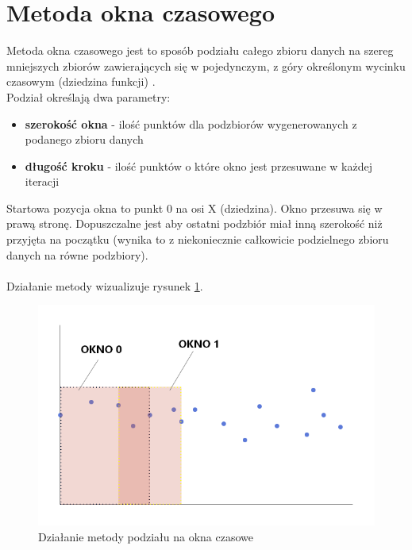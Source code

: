 \documentclass[eng,printmode]{mgr}
\begin{document}
\section{Metoda okna czasowego}
\label{sec:window}
Metoda okna czasowego jest to sposób podziału całego zbioru danych na szereg mniejszych zbiorów zawierających się w pojedynczym, z góry określonym wycinku czasowym (dziedzina funkcji) \cite{windowing} \cite{windowing-1}.\\
Podział określają dwa parametry:
\begin{itemize}
\item \textbf{szerokość okna} - ilość punktów dla podzbiorów wygenerowanych z podanego zbioru danych
\item \textbf{długość kroku} - ilość punktów o które okno jest przesuwane w każdej iteracji
\end{itemize}

Startowa pozycja okna to punkt 0 na osi X (dziedzina). Okno przesuwa się w prawą stronę. Dopuszczalne jest aby ostatni podzbiór miał inną szerokość niż przyjęta na początku (wynika to z niekoniecznie całkowicie podzielnego zbioru danych na równe podzbiory).
\\ \\
Działanie metody wizualizuje rysunek \ref{fig:okno_czasowe}.

\begin{figure}[H]

 \label{fig:okno_czasowe}
  \begin{center}
  
  \includegraphics[scale=0.7]{okno_czasowe}
  \caption{Działanie metody podziału na okna czasowe}
  
  \end{center}
\end{figure}
\end{document}
